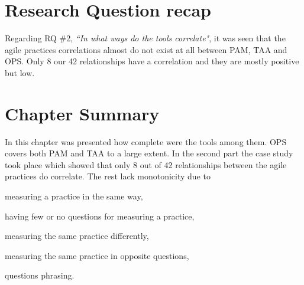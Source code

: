 



\section{Research Question recap}
Regarding RQ \#2, \textit{``In what ways do the tools correlate"}, it was seen that the agile practices correlations almost do not exist at all between \ac{PAM}, \ac{TAA} and \ac{OPS}. Only 8 our 42 relationships have a correlation and they are mostly positive but low.

\section{Chapter Summary}
In this chapter was presented how complete were the tools among them. \ac{OPS} covers both \ac{PAM} and \ac{TAA} to a large extent. In the second part the case study took place which showed that only 8 out of 42 relationships between the agile practices do correlate. The rest lack monotonicity due to
\begin{inparaenum} [a\upshape)]
	\item measuring a practice in the same way,
	\item having few or no questions for measuring a practice,
	\item measuring the same practice differently,
	\item measuring the same practice in opposite questions,
	\item questions phrasing.
\end{inparaenum}
